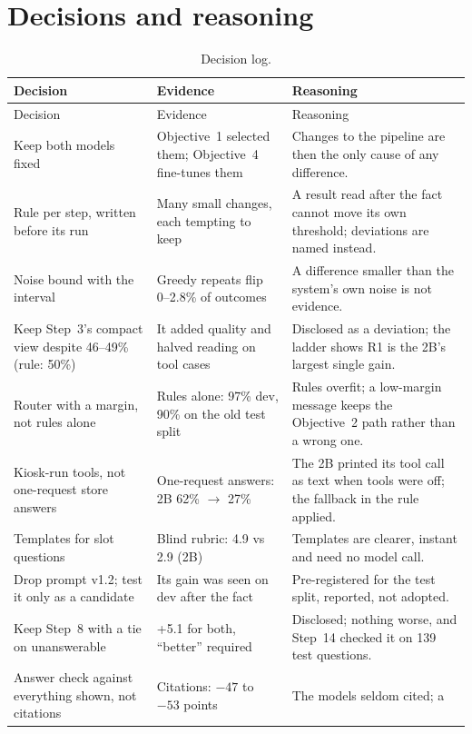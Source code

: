 \documentclass[11pt,a4paper]{article}
\begin{document}
\section{Decisions and reasoning}\label{sec:decisions}
{\small
\begin{xltabular}{\textwidth}{>{\raggedright\arraybackslash}p{3.6cm} >{\raggedright\arraybackslash}p{4.4cm} L}
\caption{Decision log.}\label{tab:decisions}\\
\toprule
Decision & Evidence & Reasoning \\
\midrule
\endfirsthead
\toprule Decision & Evidence & Reasoning \\ \midrule \endhead
Keep both models fixed & Objective~1 selected them; Objective~4 fine-tunes them & Changes to the pipeline are then the
only cause of any difference. \\
Rule per step, written before its run & Many small changes, each tempting to keep & A result read after the fact cannot
move its own threshold; deviations are named instead. \\
Noise bound with the interval & Greedy repeats flip 0--2.8\% of outcomes & A difference smaller than the system's own
noise is not evidence. \\
Keep Step~3's compact view despite 46--49\% (rule: 50\%) & It added quality and halved reading on tool cases &
Disclosed as a deviation; the ladder shows R1 is the 2B's largest single gain. \\
Router with a margin, not rules alone & Rules alone: 97\% dev, 90\% on the old test split & Rules overfit; a low-margin
message keeps the Objective~2 path rather than a wrong one. \\
Kiosk-run tools, not one-request store answers & One-request answers: 2B 62\% $\to$ 27\% & The 2B printed its tool call
as text when tools were off; the fallback in the rule applied. \\
Templates for slot questions & Blind rubric: 4.9 vs 2.9 (2B) & Templates are clearer, instant and need no model
call. \\
Drop prompt v1.2; test it only as a candidate & Its gain was seen on dev after the fact & Pre-registered for the test
split, reported, not adopted. \\
Keep Step~8 with a tie on unanswerable & +5.1 for both, ``better'' required & Disclosed; nothing worse, and Step~14
checked it on 139 test questions. \\
Answer check against everything shown, not citations & Citations: $-47$ to $-53$ points & The models seldom cited; a

\end{xltabular}}
\end{document}

